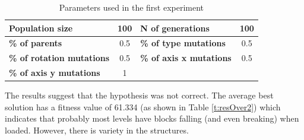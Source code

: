\documentclass[sigconf]{acmart}
\newcommand{\myfloatalign}{\centering} %
\begin{document}

\begin{table}
	\myfloatalign
	\caption{Parameters used in the first experiment} 
	\label{t:base}
	\begin{tabular}{lclc}
		\hline
		\textbf{Population size} & 100 & \textbf{N of generations} & 100\\ \hline
		\textbf{\% of parents} &  0.5 &\textbf{\% of type mutations} & 0.5\\  \hline
		\textbf{\% of rotation mutations} & 0.5 & \textbf{\% of axis x mutations}  & 0.5 \\  \hline
		\textbf{\% of axis y mutations}  & 1 & &\\  \hline
	\end{tabular}
\end{table}

The results suggest that the hypothesis was not correct. The average best 
solution has a fitness value of 61.334 (as shown in Table \ref{t:resOver2}) 
which indicates that probably most levels have blocks falling (and even 
breaking) when loaded. However, there is variety in the structures.

\end{document}
